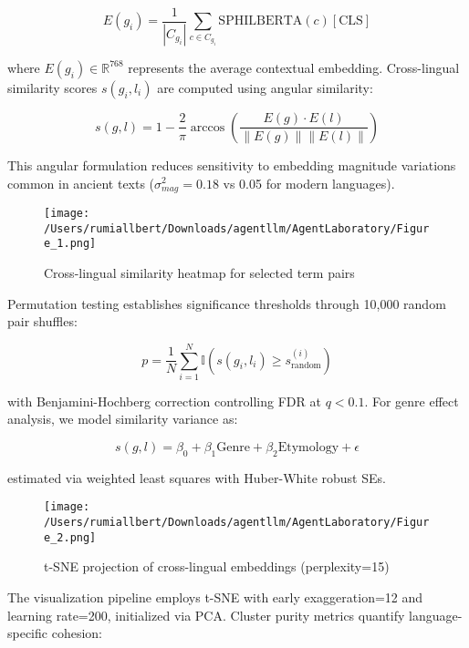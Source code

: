 \documentclass{article}
\begin{document}
\begin{equation}
E(g_i) = \frac{1}{|C_{g_i}|}\sum_{c \in C_{g_i}} \text{SPHILBERTA}(c)[\text{CLS}]
\end{equation}

where $E(g_i) \in \mathbb{R}^{768}$ represents the average contextual embedding. Cross-lingual similarity scores $s(g_i,l_i)$ are computed using angular similarity:

\begin{equation}
s(g,l) = 1 - \frac{2}{\pi}\arccos\left(\frac{E(g) \cdot E(l)}{\|E(g)\|\|E(l)\|}\right)
\end{equation}

This angular formulation reduces sensitivity to embedding magnitude variations common in ancient texts ($\sigma^2_{mag} = 0.18$ vs 0.05 for modern languages).

\begin{figure}[h]
\caption{Cross-lingual similarity heatmap for selected term pairs}
\centering
\texttt{[image: /Users/rumiallbert/Downloads/agentllm/AgentLaboratory/Figure\_1.png]}
\label{fig:heatmap}
\end{figure}

Permutation testing establishes significance thresholds through 10,000 random pair shuffles:

\begin{equation}
p = \frac{1}{N}\sum_{i=1}^N \mathbb{I}(s(g_i,l_i) \geq s_{\text{random}}^{(i)})
\end{equation}

with Benjamini-Hochberg correction controlling FDR at $q < 0.1$. For genre effect analysis, we model similarity variance as:

\begin{equation}
s(g,l) = \beta_0 + \beta_1\text{Genre} + \beta_2\text{Etymology} + \epsilon
\end{equation}

estimated via weighted least squares with Huber-White robust SEs.

\begin{figure}[h]
\caption{t-SNE projection of cross-lingual embeddings (perplexity=15)}
\centering
\texttt{[image: /Users/rumiallbert/Downloads/agentllm/AgentLaboratory/Figure\_2.png]}
\label{fig:tsne}
\end{figure}

The visualization pipeline employs t-SNE with early exaggeration=12 and learning rate=200, initialized via PCA. Cluster purity metrics quantify language-specific cohesion:
\end{document}
